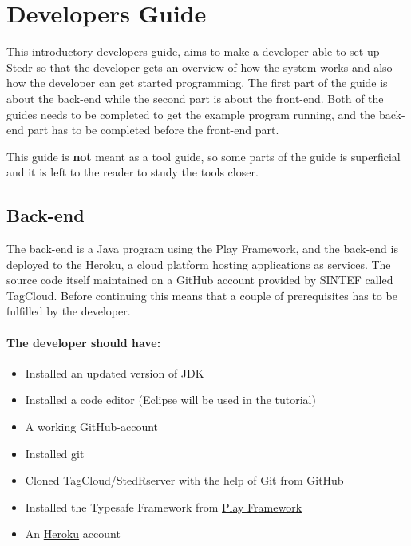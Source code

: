\section{Developers Guide}
This introductory developers guide, aims to make a developer able to set up Stedr so that the developer gets an overview of how the system works and also how the developer can get started programming. The first part of the guide is about the back-end while the second part is about the front-end. Both of the guides needs to be completed to get the example program running, and the back-end part has to be completed before the front-end part. 

\noindent

This guide is \textbf{not} meant as a tool guide, so some parts of the guide is superficial and it is left to the reader to study the tools closer.

\subsection{Back-end}

The back-end is a Java program using the Play Framework, and the back-end is deployed to the Heroku, a cloud platform hosting applications as services. The source code itself maintained on a GitHub account provided by SINTEF called TagCloud. Before continuing this means that a couple of prerequisites has to be fulfilled by the developer.

\paragraph{The developer should have:}
\begin{itemize}
\item Installed an updated version of JDK 
\item Installed a code editor (Eclipse will be used in the tutorial)
\item A working GitHub-account
\item Installed git
\item Cloned TagCloud/StedR\textunderscore server with the help of Git from GitHub
\item Installed the Typesafe Framework from \href{http://www.playframework.com/download}{Play Framework}
\item An \href{https://www.heroku.com/}{Heroku} account 
\end{itemize}  

